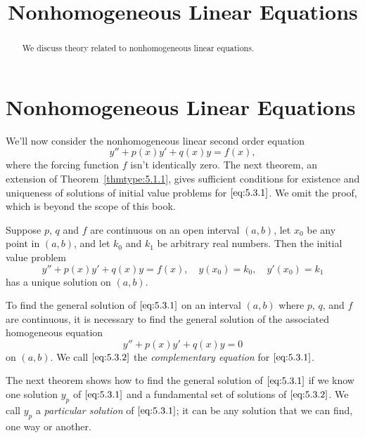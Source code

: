 \documentclass{ximera}
\title{Nonhomogeneous Linear Equations}
\begin{document}
 
\begin{abstract}
 We discuss theory related to nonhomogeneous linear equations.
\end{abstract}
 
\maketitle
 
\section*{Nonhomogeneous Linear Equations}
 
We'll now consider the nonhomogeneous linear second order equation
\begin{equation} \label{eq:5.3.1}
y''+p(x)y'+q(x)y=f(x),
\end{equation}
where the forcing function $f$ isn't  identically zero. The next
theorem, an extension of Theorem~\ref{thmtype:5.1.1}, gives sufficient
conditions for existence and uniqueness of solutions of initial value
problems for $\eqref{eq:5.3.1}$. We omit the proof, which is beyond the
scope of this book.
 
\begin{theorem}\label{thmtype:5.3.1}
Suppose $p$, $q$ and $f$ are continuous on an open interval
$(a,b)$, let $x_0$ be any point in $(a,b)$, and let $k_0$ and $k_1$ be
arbitrary real numbers. Then the initial value problem
$$
y''+p(x)y'+q(x)y=f(x), \quad  y(x_0)=k_0,\quad y'(x_0)=k_1
$$
 has a unique solution  on $(a,b)$.
\end{theorem}
 
To find the general solution of  $\eqref{eq:5.3.1}$
on an interval $(a,b)$ where $p$, $q$, and $f$ are continuous,
it is necessary to find the general solution of
the associated homogeneous equation
\begin{equation} \label{eq:5.3.2}
y''+p(x)y'+q(x)y=0
\end{equation}
on $(a,b)$. We call $\eqref{eq:5.3.2}$ the \textit{complementary equation}
for $\eqref{eq:5.3.1}$.
 
The next theorem shows how to find the general solution of
$\eqref{eq:5.3.1}$ if we know one solution $y_p$ of $\eqref{eq:5.3.1}$ and a
fundamental set of solutions of $\eqref{eq:5.3.2}$. We call
$y_p$ a \textit{particular solution} of $\eqref{eq:5.3.1}$; it can be any solution that we can find, one way or another.
 
\end{document}

